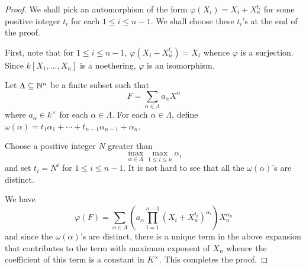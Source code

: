\begin{proof}
    We shall pick an automorphism of the form $\varphi(X_i) = X_i + X_n^{t_i}$ for some positive integer $t_i$ for each $1\le i\le n - 1$. We shall choose these $t_i$'s at the end of the proof.

    First, note that for $1\le i\le n - 1$, $\varphi(X_i - X_n^{t_i}) = X_i$ whence $\varphi$ is a surjection. Since $k[X_1,\dots,X_n]$ is a noethering, $\varphi$ is an isomorphism.

    Let $\Lambda\subseteq\mathbb{N}^n$ be a finite subset such that 
    \begin{equation*}
        F = \sum_{\alpha\in\Lambda}a_\alpha X^\alpha
    \end{equation*}
    where $a_\alpha\in k^\times$ for each $\alpha\in\Lambda$. For each $\alpha\in\Lambda$, define $\omega(\alpha) = t_1\alpha_1 + \cdots + t_{n - 1}\alpha_{n - 1} + \alpha_n$.

    Choose a positive integer $N$ greater than 
    \begin{equation*}
        \max_{\alpha\in\Lambda}\max_{1\le i\le n}\alpha_i
    \end{equation*}
    and set $t_i = N^i$ for $1\le i\le n - 1$. It is not hard to see that all the $\omega(\alpha)$'s are distinct. 

    We have 
    \begin{equation*}
        \varphi(F) = \sum_{\alpha\in\Lambda}\left(a_\alpha\prod_{i = 1}^{n - 1}(X_i + X_n^{t_i})^{\alpha_i}\right)X_n^{\alpha_n}
    \end{equation*}
    and since the $\omega(\alpha)$'s are distinct, there is a unique term in the above expansion that contributes to the term with maximum exponent of $X_n$ whence the coefficient of this term is a constant in $K^\times$. This completes the proof.
\end{proof}

